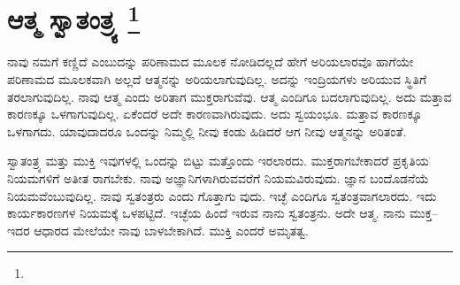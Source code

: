 
\chapter[ಆತ್ಮ ಸ್ವಾತಂತ್ರ್ಯ ]{ಆತ್ಮ ಸ್ವಾತಂತ್ರ್ಯ \protect\footnote{}}

ನಾವು ನಮಗೆ ಕಣ್ಣಿದೆ ಎಂಬುದನ್ನು ಪರಿಣಾಮದ ಮೂಲಕ ನೋಡಿದಲ್ಲದೆ ಹೇಗೆ ಅರಿಯಲಾರವೊ ಹಾಗೆಯೇ ಪರಿಣಾಮದ ಮೂಲಕವಾಗಿ ಅಲ್ಲದೆ ಆತ್ಮನನ್ನು ಅರಿಯಲಾಗುವುದಿಲ್ಲ. ಅದನ್ನು ಇಂದ್ರಿಯಗಳು ಅರಿಯುವ ಸ್ಥಿತಿಗೆ ತರಲಾಗುವುದಿಲ್ಲ. ನಾವು ಆತ್ಮ ಎಂದು ಅರಿತಾಗ ಮುಕ್ತರಾಗುವೆವು. ಆತ್ಮ ಎಂದಿಗೂ ಬದಲಾಗುವುದಿಲ್ಲ. ಅದು ಮತ್ತಾವ ಕಾರಣಕ್ಕೂ ಒಳಗಾಗುವುದಿಲ್ಲ. ಏಕೆಂದರೆ ಅದೇ ಕಾರಣವಾಗಿರುವುದು. ಅದು ಸ್ವಯಂಭೂ. ಮತ್ತಾವ ಕಾರಣಕ್ಕೂ ಒಳಗಾಗದು. ಯಾವುದಾದರೂ ಒಂದನ್ನು ನಿಮ್ಮಲ್ಲಿ ನೀವು ಕಂಡು ಹಿಡಿದರೆ ಆಗ ನೀವು ಆತ್ಮನನ್ನು ಅರಿತಂತೆ.

ಸ್ವಾತಂತ್ರ್ಯ ಮತ್ತು ಮುಕ್ತಿ ಇವುಗಳಲ್ಲಿ ಒಂದನ್ನು ಬಿಟ್ಟು ಮತ್ತೊಂದು ಇರಲಾರದು. ಮುಕ್ತರಾಗಬೇಕಾದರೆ ಪ್ರಕೃತಿಯ ನಿಯಮಗಳಿಗೆ ಅತೀತ ರಾಗಬೇಕು. ನಾವು ಅಜ್ಞಾನಿಗಳಾಗಿರುವವರೆಗೆ ನಿಯಮವಿರುವುದು. ಜ್ಞಾನ ಬಂದೊಡನೆಯೆ ನಿಯಮವೆಂಬುವುದಿಲ್ಲ. ನಾವು ಸ್ವತಂತ್ರರು ಎಂದು ಗೊತ್ತಾಗು ವುದು. ಇಚ್ಛೆ ಎಂದಿಗೂ ಸ್ವತಂತ್ರವಾಗಲಾರದು. ಇದು ಕಾರ್ಯಕಾರಣಗಳ ನಿಯಮಕ್ಕೆ ಒಳಪಟ್ಟಿದೆ. ಇಚ್ಛೆಯ ಹಿಂದೆ ಇರುವ ನಾನು ಸ್ವತಂತ್ರನು. ಅದೇ ಆತ್ಮ. ನಾನು ಮುಕ್ತ–ಇದರ ಆಧಾರದ ಮೇಲೆಯೇ ನಾವು ಬಾಳಬೇಕಾಗಿದೆ. ಮುಕ್ತಿ ಎಂದರೆ ಅಮೃತತ್ವ.

